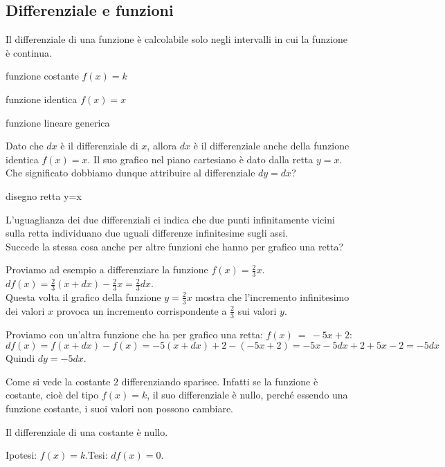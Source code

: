 \subsection{Differenziale e funzioni}
\label{subse:04:difffun}
\begin{osservazione}
 Il differenziale di una funzione è calcolabile solo negli intervalli in cui
 la funzione è continua.
\end{osservazione}

funzione costante $f(x)=k$


funzione identica $f(x)=x$

funzione lineare generica

Dato che $dx$ è il differenziale di $x$, allora $dx$ è il differenziale anche 
della funzione identica $f(x)=x$. Il suo grafico nel piano cartesiano è dato 
dalla retta $y=x$. Che significato dobbiamo dunque attribuire al differenziale $dy=dx$?

disegno retta y=x 

L'uguaglianza dei due differenziali ci indica che due punti  infinitamente
vicini sulla retta individuano due uguali differenze infinitesime sugli assi.\\
Succede la stessa cosa anche per altre funzioni che hanno per grafico una retta?
\begin{esempio}
 Proviamo ad esempio a differenziare la funzione $f(x)=\frac{2}{3}x$.\\
\( df(x)=\frac{2}{3}(x+dx)-\frac{2}{3}x=\frac{2}{3}dx\).\\
Questa volta il grafico della funzione $y=\frac{2}{3}x$ mostra che
l'incremento infinitesimo dei valori $x$ provoca un incremento corrispondente 
a $\frac{2}{3}$ sui valori $y$.
\end{esempio}
\begin{esempio}
Proviamo con un'altra funzione che ha per grafico una retta: \(f(x)~=~-5x+2\):
\[
 df(x)= f(x+dx)-f(x)=-5(x+dx)+2-(-5x+2)=-5x-5dx+2+5x-2=-5dx
\]
Quindi $dy=-5dx$. 
\end{esempio}

Come si vede la costante $2$ differenziando sparisce. Infatti
se la funzione è costante, cioè del tipo $f(x)=k$, il suo differenziale è nullo,
perché essendo una funzione costante, i suoi valori non possono cambiare.

\begin{teorema}
Il differenziale di una costante è nullo.
\end{teorema}

\noindent Ipotesi: \(f(x)=k\).\tab Tesi: \(df(x)=0\).

